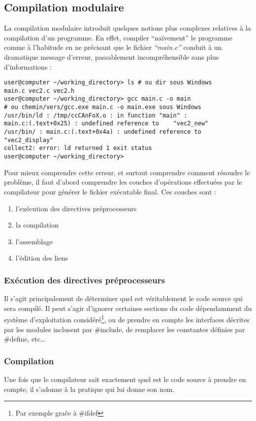 \documentclass[../../../main.tex]{subfiles}
\begin{document}
\subsection{Compilation modulaire}
La compilation modulaire introduit quelques notions plus complexes relatives à la compilation d'un programme. En effet, compiler ``naïvement'' le programme comme à l'habitude en ne précisant que le fichier \textit{``main.c''} conduit à un dramatique message d'erreur, passablement incompréhensible sans plus d'informations :
\begin{verbatim}
user@computer ~/working_directory> ls # ou dir sous Windows
main.c vec2.c vec2.h
user@computer ~/working_directory> gcc main.c -o main
# ou chemin/vers/gcc.exe main.c -o main.exe sous Windows
/usr/bin/ld : /tmp/ccCAnFoX.o : in function "main" :
main.c:(.text+0x25) : undefined reference to	"vec2_new"
/usr/bin/ : main.c:(.text+0x4a) : undefined reference to "vec2_display"
collect2: error: ld returned 1 exit status
user@computer ~/working_directory>
\end{verbatim}
Pour mieux comprendre cette erreur, et surtout comprendre comment résoudre le problème, il faut d'abord comprendre les couches d'opérations effectuées par le compilateur pour générer le fichier exécutable final. Ces couches sont :
\begin{enumerate}
	\item l'exécution des directives préprocesseurs
	\item la compilation \cite{Aho}
	\item l'assemblage \cite{AL}
	\item l'édition des liens \cite{AL}\cite{LL}
\end{enumerate}
\subsubsection{Exécution des directives préprocesseurs}
Il s'agit principalement de déterminer quel est véritablement le code source qui sera compilé. Il peut s'agir d'ignorer certaines sections du code dépendamment du système d'exploitation considéré\footnote{Par exemple graĉe à \#ifdef}, ou de prendre en compte les interfaces décrites par les modules inclusent par \textsf{\#include}, de remplacer les constantes définies par \textsf{\#define}, etc\dots
\subsubsection{Compilation}
Une fois que le compilateur sait exactement quel est le code source à prendre en compte, il s'adonne à la pratique qui lui donne son nom.
 
\end{document}
